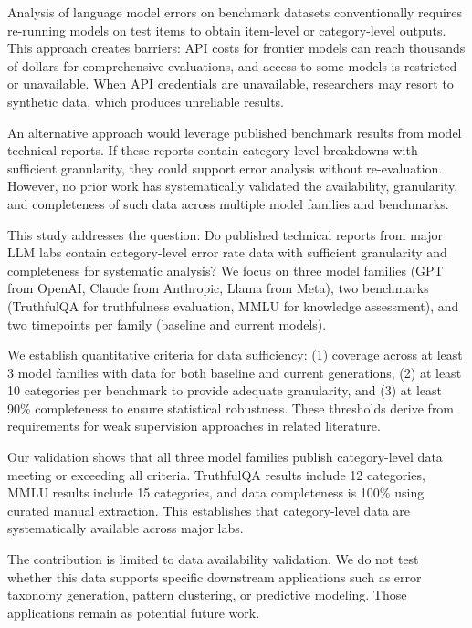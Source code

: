 
Analysis of language model errors on benchmark datasets conventionally requires re-running models on test items to obtain item-level or category-level outputs. This approach creates barriers: API costs for frontier models can reach thousands of dollars for comprehensive evaluations, and access to some models is restricted or unavailable. When API credentials are unavailable, researchers may resort to synthetic data, which produces unreliable results.

An alternative approach would leverage published benchmark results from model technical reports. If these reports contain category-level breakdowns with sufficient granularity, they could support error analysis without re-evaluation. However, no prior work has systematically validated the availability, granularity, and completeness of such data across multiple model families and benchmarks.

This study addresses the question: Do published technical reports from major LLM labs contain category-level error rate data with sufficient granularity and completeness for systematic analysis? We focus on three model families (GPT from OpenAI, Claude from Anthropic, Llama from Meta), two benchmarks (TruthfulQA for truthfulness evaluation, MMLU for knowledge assessment), and two timepoints per family (baseline and current models).

We establish quantitative criteria for data sufficiency: (1) coverage across at least 3 model families with data for both baseline and current generations, (2) at least 10 categories per benchmark to provide adequate granularity, and (3) at least 90\% completeness to ensure statistical robustness. These thresholds derive from requirements for weak supervision approaches in related literature.

Our validation shows that all three model families publish category-level data meeting or exceeding all criteria. TruthfulQA results include 12 categories, MMLU results include 15 categories, and data completeness is 100\% using curated manual extraction. This establishes that category-level data are systematically available across major labs.

The contribution is limited to data availability validation. We do not test whether this data supports specific downstream applications such as error taxonomy generation, pattern clustering, or predictive modeling. Those applications remain as potential future work.
